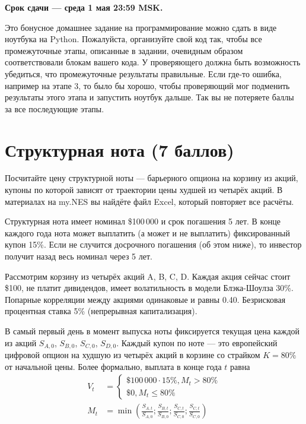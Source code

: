 \documentclass[a4paper,14pt]{extarticle}
\begin{document}
\noindent \textbf{Срок сдачи --- среда 1 мая 23:59 MSK.}

\vspace{\baselineskip}

\noindent Это бонусное домашнее задание на программирование можно сдать в виде ноутбука на Python. Пожалуйста, организуйте свой код так,
чтобы все промежуточные этапы, описанные в задании, очевидным образом соответствовали блокам вашего кода. У проверяющего должна 
быть возможность убедиться, что промежуточные результаты правильные. Если где-то ошибка, например на этапе 3, то было бы хорошо, чтобы 
проверяющий мог подменить результаты этого этапа и запустить ноутбук дальше. Так вы не потеряете баллы за все последующие этапы.

\section{Структурная нота (7 баллов)}

Посчитайте цену структурной ноты --- барьерного опциона на корзину из акций, 
купоны по которой зависят от траектории цены худшей из четырёх акций. В 
материалах на my.NES вы найдёте файл Excel, который повторяет все расчёты.

Структурная нота имеет номинал \$100\,000 и срок погашения 5 лет. В конце каждого года нота может выплатить (а может и не выплатить) фиксированный купон 15\%. Если не случится досрочного погашения (об этом ниже), то инвестор получит назад весь номинал через 5 лет.

Рассмотрим корзину из четырёх акций A, B, C, D. Каждая акция сейчас стоит
\$100, не платит дивидендов, имеет волатильность в модели Блэка-Шоулза 30\%.
Попарные корреляции между акциями одинаковые и равны 0.40. Безрисковая 
процентная ставка 5\% (непрерывная капитализация).

В самый первый день в момент выпуска ноты фиксируется текущая цена каждой из
акций $S_{A,0}$, $S_{B,0}$, $S_{C,0}$, $S_{D,0}$. Каждый купон по ноте
--- это европейский цифровой опцион на худшую из четырёх акций в корзине со страйком
$K=80\%$ от начальной цены. Более формально, выплата в конце года $t$ равна
\begin{align*}
V_t &= \begin{cases}\$100\,000 \cdot 15\%, M_t > 80\% \\
\$0, M_t \le 80\%
\end{cases}\\
M_t &= \min\left(\frac{S_{A,t}}{S_{A,0}}; \frac{S_{B,t}}{S_{B,0}}; \frac{S_{C,t}}{S_{C,0}}; \frac{S_{C,t}}{S_{C,0}}\right) 
\end{align*}
\end{document}
